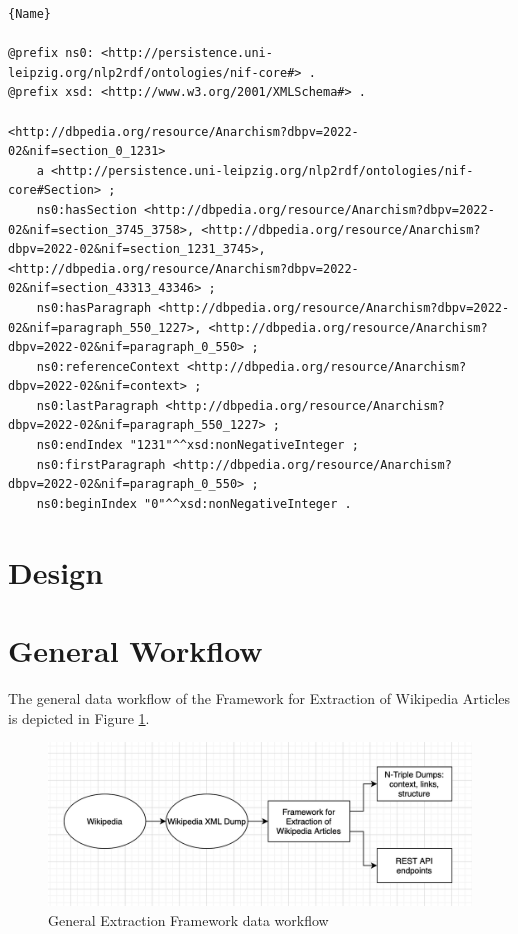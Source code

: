 \documentclass[thesis=M,english,hidelinks]{FITthesis}[2019/12/23]
\begin{document}
\begin{lstlisting}[caption=Example of an output for a Section,frame=tlrb,  label = {lst:nif-links}]{Name}

@prefix ns0: <http://persistence.uni-leipzig.org/nlp2rdf/ontologies/nif-core#> .
@prefix xsd: <http://www.w3.org/2001/XMLSchema#> .

<http://dbpedia.org/resource/Anarchism?dbpv=2022-02&nif=section_0_1231>
	a <http://persistence.uni-leipzig.org/nlp2rdf/ontologies/nif-core#Section> ;
	ns0:hasSection <http://dbpedia.org/resource/Anarchism?dbpv=2022-02&nif=section_3745_3758>, <http://dbpedia.org/resource/Anarchism?dbpv=2022-02&nif=section_1231_3745>, <http://dbpedia.org/resource/Anarchism?dbpv=2022-02&nif=section_43313_43346> ;
	ns0:hasParagraph <http://dbpedia.org/resource/Anarchism?dbpv=2022-02&nif=paragraph_550_1227>, <http://dbpedia.org/resource/Anarchism?dbpv=2022-02&nif=paragraph_0_550> ;
	ns0:referenceContext <http://dbpedia.org/resource/Anarchism?dbpv=2022-02&nif=context> ;
	ns0:lastParagraph <http://dbpedia.org/resource/Anarchism?dbpv=2022-02&nif=paragraph_550_1227> ;
	ns0:endIndex "1231"^^xsd:nonNegativeInteger ;
	ns0:firstParagraph <http://dbpedia.org/resource/Anarchism?dbpv=2022-02&nif=paragraph_0_550> ;
	ns0:beginIndex "0"^^xsd:nonNegativeInteger .
\end{lstlisting}



\section{Design}

\section{General Workflow}

The general data workflow of the Framework for Extraction of Wikipedia Articles is depicted in Figure \ref{fig:general-architecture}.

\begin{figure}
	\centering
	\includegraphics[width=1.0\linewidth]{general_architecture}
	\caption{General Extraction Framework data workflow}
	\label{fig:general-architecture}
\end{figure}
\end{document}
